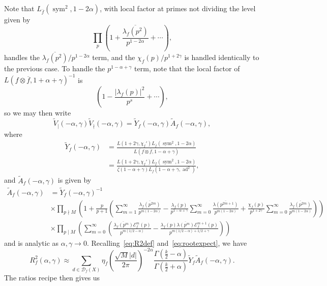 \documentclass[11pt,reqno]{amsart} \usepackage{fullpage}
\newcommand{\ra}{\rightarrow}
\newcommand\be{\begin{equation}}
\newcommand\ee{\end{equation}}
\newcommand{\Lad}[1]{L_f\left(#1,\ad^2\right)}
\newcommand{\Lchi}[2][]{L(#2,\chi_f#1)}
\DeclareMathOperator{\sym}{sym}
\DeclareMathOperator{\ad}{ad}
\newcommand{\D}{\mathcal D_f}
\newcommand{\E}{\mathcal E_f}
\numberwithin{equation}{section}
\begin{document}
Note that $L_{\overline f}(\sym^2,1-2\alpha)$, with local factor at primes
not dividing the level given by
\be\prod_p\left(1+\frac{\overline{\lambda_f(p^2)}}{p^{1-2\alpha}}+\cdots\right),\ee
handles the $\overline{\lambda_f(p^2)}/p^{1-2\alpha}$ term, and the
$\chi_f(p)/p^{1+2\gamma}$ is handled identically to the previous case.
To handle the $p^{1-\alpha+\gamma}$ term, note that the local factor of
$L(f\otimes\overline f,1+\alpha+\gamma)^{-1}$ is
\be\left(1-\frac{\left|\lambda_f(p)\right|^2}{p^s}+\cdots\right),\ee
so we may then write
\be \tilde{V}_\mid(-\alpha,\gamma)\tilde{V}_\nmid(-\alpha,\gamma)
= \tilde{Y}_f(-\alpha,\gamma)\tilde{A}_f(-\alpha,\gamma), \ee
where
\begin{align}\label{eq:tildeYfdef}
  \tilde{Y}_f(-\alpha,\gamma)
  &=\frac{\Lchi[']{1+2\gamma}L_{\overline f}(\sym^2,1-2\alpha)}
    {L(f\otimes\overline f,1-\alpha+\gamma)} \\
  &=\frac{\Lchi[']{1+2\gamma}L_{\overline f}(\sym^2,1-2\alpha)}
    {\zeta(1-\alpha+\gamma)\Lad{1-\alpha+\gamma}},
\end{align}
and $\tilde{A}_f(-\alpha,\gamma)$ is given by
\be\label{eq:tildeAfdef} \begin{aligned}
  \tilde{A}_f(-\alpha,\gamma) &= \tilde{Y}_f(-\alpha,\gamma)^{-1} \\
  &\times \prod_{p\nmid M}
  \left(1+\frac p{p+1}\left(
      \sum_{m=1}^\infty
      \frac{\overline{\lambda_f(p^{2m})}}{p^{m(1-2\alpha)}}
      -\frac{\lambda_f(p)}{p^{1-\alpha+\gamma}}
      \sum_{m=0}^\infty
      \frac{\overline{\lambda(p^{2m+1})}}{p^{m(1-2\alpha)}}
      +\frac{\chi_f(p)}{p^{1+2\gamma}}
      \sum_{m=0}^\infty
      \frac{\overline{\lambda_f(p^{2m})}}{p^{m(1-2\alpha)}}
    \right)
  \right) \\
  &\times \prod_{p\mid M}
  \left(
    \sum_{m=0}^\infty\left(
      \frac{\overline{\lambda_f(p^{m})}\E^{m}(p)}{p^{m(1/2-\alpha)}}
      -\frac{\lambda_f(p)\overline{\lambda(p^{m})}\E^{m+1}(p)}
      {p^{m(1/2-\alpha)+1/2+\gamma}}
    \right)
  \right)
\end{aligned}\ee
and is analytic as $\alpha,\gamma\ra0$. Recalling~\eqref{eq:R2def}
and~\eqref{eq:rootexpect}, we have
\be R^2_f(\alpha,\gamma)\approx
\sum_{d\in\D(X)}\eta_f\left(\frac{\sqrt M |d|}{2\pi}\right)^{-2\alpha}
\frac{\Gamma\left(\frac k2-\alpha\right)}{\Gamma\left(\frac k2+\alpha\right)}
\tilde{Y}_f\tilde{A}_f(-\alpha,\gamma). \ee
The ratios recipe then gives us
\end{document}

